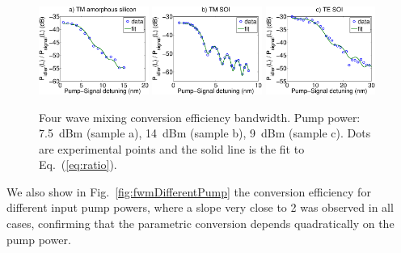 \documentclass[10pt,letterpaper]{article}
\begin{document}
\begin{figure}[htb]
    \centering
    \includegraphics[width=0.32\textwidth]{fwm_bandwidth_P13_TM20mm_15dBmPump_6dBcm_332Wm_6474psKmnm_big_1pointMore}
    \includegraphics[width=0.32\textwidth]{fwm_bandwidth_V740_C11_TM25mm_20dBm_pump_1p67_46p81_19860psKmnm_big}
    \includegraphics[width=0.32\textwidth]{fwm_BW_V740C11_TE25mm_15dBmPump_3p8dBcm_361Wm_-1322psKmnm_big}
    \caption{Four wave mixing conversion efficiency bandwidth. Pump power: 7.5~dBm (sample a), 14~dBm (sample b), 9~dBm (sample c). Dots are experimental points and the solid line is the fit to Eq.~(\ref{eq:ratio}).}
    \label{fig:fwmBw}
\end{figure}

We also show in Fig.~\ref{fig:fwmDifferentPump} the conversion efficiency for different input pump powers, where a slope very close to 2 was observed in all cases, confirming that the parametric conversion depends quadratically on the pump power.
\end{document}
